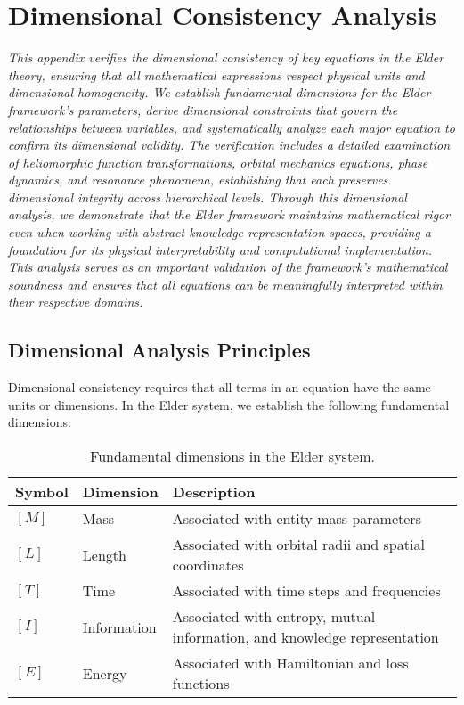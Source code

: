 \chapter{Dimensional Consistency Analysis}

\textit{This appendix verifies the dimensional consistency of key equations in the Elder theory, ensuring that all mathematical expressions respect physical units and dimensional homogeneity. We establish fundamental dimensions for the Elder framework's parameters, derive dimensional constraints that govern the relationships between variables, and systematically analyze each major equation to confirm its dimensional validity. The verification includes a detailed examination of heliomorphic function transformations, orbital mechanics equations, phase dynamics, and resonance phenomena, establishing that each preserves dimensional integrity across hierarchical levels. Through this dimensional analysis, we demonstrate that the Elder framework maintains mathematical rigor even when working with abstract knowledge representation spaces, providing a foundation for its physical interpretability and computational implementation. This analysis serves as an important validation of the framework's mathematical soundness and ensures that all equations can be meaningfully interpreted within their respective domains.}

\section{Dimensional Analysis Principles}

Dimensional consistency requires that all terms in an equation have the same units or dimensions. In the Elder system, we establish the following fundamental dimensions:

\begin{table}[h]
\centering
\begin{tabular}{|l|l|p{8cm}|}
\hline
\textbf{Symbol} & \textbf{Dimension} & \textbf{Description} \\
\hline
$[M]$ & Mass & Associated with entity mass parameters \\
\hline
$[L]$ & Length & Associated with orbital radii and spatial coordinates \\
\hline
$[T]$ & Time & Associated with time steps and frequencies \\
\hline
$[I]$ & Information & Associated with entropy, mutual information, and knowledge representation \\
\hline
$[E]$ & Energy & Associated with Hamiltonian and loss functions \\
\hline
\end{tabular}
\caption{Fundamental dimensions in the Elder system.}
\label{tab:fundamental_dimensions}
\end{table}

